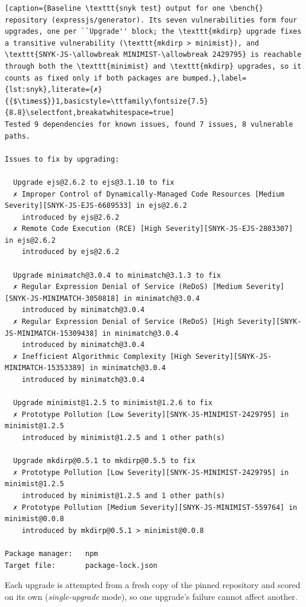 \documentclass[11pt]{article}
\theoremstyle{definition}
\newcommand{\bench}{VulnBump}
\begin{document}
\begin{lstlisting}[caption={Baseline \texttt{snyk test} output for one \bench{} repository (expressjs/generator). Its seven vulnerabilities form four upgrades, one per ``Upgrade'' block; the \texttt{mkdirp} upgrade fixes a transitive vulnerability (\texttt{mkdirp > minimist}), and \texttt{SNYK-JS-\allowbreak MINIMIST-\allowbreak 2429795} is reachable through both the \texttt{minimist} and \texttt{mkdirp} upgrades, so it counts as fixed only if both packages are bumped.},label={lst:snyk},literate={✗}{{$\times$}}1,basicstyle=\ttfamily\fontsize{7.5}{8.8}\selectfont,breakatwhitespace=true]
Tested 9 dependencies for known issues, found 7 issues, 8 vulnerable paths.

Issues to fix by upgrading:

  Upgrade ejs@2.6.2 to ejs@3.1.10 to fix
  ✗ Improper Control of Dynamically-Managed Code Resources [Medium Severity][SNYK-JS-EJS-6689533] in ejs@2.6.2
    introduced by ejs@2.6.2
  ✗ Remote Code Execution (RCE) [High Severity][SNYK-JS-EJS-2803307] in ejs@2.6.2
    introduced by ejs@2.6.2

  Upgrade minimatch@3.0.4 to minimatch@3.1.3 to fix
  ✗ Regular Expression Denial of Service (ReDoS) [Medium Severity][SNYK-JS-MINIMATCH-3050818] in minimatch@3.0.4
    introduced by minimatch@3.0.4
  ✗ Regular Expression Denial of Service (ReDoS) [High Severity][SNYK-JS-MINIMATCH-15309438] in minimatch@3.0.4
    introduced by minimatch@3.0.4
  ✗ Inefficient Algorithmic Complexity [High Severity][SNYK-JS-MINIMATCH-15353389] in minimatch@3.0.4
    introduced by minimatch@3.0.4

  Upgrade minimist@1.2.5 to minimist@1.2.6 to fix
  ✗ Prototype Pollution [Low Severity][SNYK-JS-MINIMIST-2429795] in minimist@1.2.5
    introduced by minimist@1.2.5 and 1 other path(s)

  Upgrade mkdirp@0.5.1 to mkdirp@0.5.5 to fix
  ✗ Prototype Pollution [Low Severity][SNYK-JS-MINIMIST-2429795] in minimist@1.2.5
    introduced by minimist@1.2.5 and 1 other path(s)
  ✗ Prototype Pollution [Medium Severity][SNYK-JS-MINIMIST-559764] in minimist@0.0.8
    introduced by mkdirp@0.5.1 > minimist@0.0.8

Package manager:   npm
Target file:       package-lock.json
\end{lstlisting}

Each upgrade is attempted from a fresh copy of the pinned repository and scored on its own (\emph{single-upgrade} mode), so one upgrade's failure cannot affect another.
\end{document}
